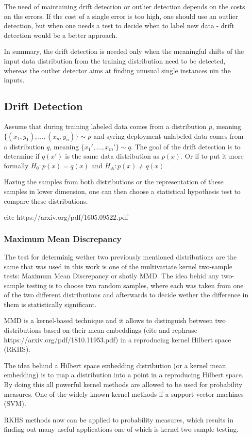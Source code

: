 The need of maintaining drift detection or outlier detection depends on the costs on the errors. If the cost of a single error is too high, one should use an outlier detection, but when one needs a test to decide when to label new data - drift detection would be a better approach.

In summary, the drift detection is needed only when the meaningful shifts of the input data distribution from the training distribution need to be detected, whereas the outlier detector aims at finding unusual single instances uin the inputs.

\subsection{Drift Detection}
Assume that during training labeled data comes from a distribution $p$, meaning $\{(x_1, y_1), ..., (x_n, y_n)\} \sim p$ and syring deployment unlabeled data comes from a distribution $q$, meaning $\{x_1', ..., x_m'\} \sim q$. The goal of the drift detection is to determine if $q(x')$ is the same data distribution as $p(x)$. Or if to put it more formally $H_0:p(x) = q(x)$ and $H_A:p(x) \neq q(x)$

Having the samples from both distributions or the representation of these samples in lower dimension, one can then choose a statistical hypothesis test to compare these distributions. 

cite https://arxiv.org/pdf/1605.09522.pdf

\subsubsection{Maximum Mean Discrepancy}

The test for determinig wether two previously mentioned distributions are the same that was used in this work is one of the multivariate kernel two-sample tests: Maximum Mean Discrepancy or shotly MMD. The idea behid any two-sample testing is to choose two random samples, where each was taken from one of the two different distributions and afterwards to decide wether the difference in them is statistically significant. 

MMD is a kernel-based technique and it allows to distinguish between two distributions based on their mean embeddings (cite and rephrase https://arxiv.org/pdf/1810.11953.pdf) in a reproducing kernel Hilbert space (RKHS).

The idea behind a Hilbert space embedding distribution (or a kernel mean embedding) is to map a distribution into a point in a reproducing Hilbert space. By doing this all powerful kernel methods are allowed to be used for probability measures. One of the widely known kernel methods if a support vector machines (SVM).




RKHS methods now can be applied to probability measures, which results in finding out many useful applications one of which is kernel two-sample testing. 
